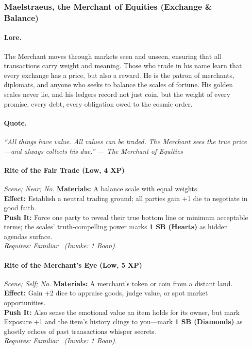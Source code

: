 \subsubsection{Maelstraeus, the Merchant of Equities (Exchange \& Balance)}

\paragraph{Lore.}
The Merchant moves through markets seen and unseen, ensuring that all transactions carry weight and meaning. Those who trade in his name learn that every exchange has a price, but also a reward. He is the patron of merchants, diplomats, and anyone who seeks to balance the scales of fortune. His golden scales never lie, and his ledgers record not just coin, but the weight of every promise, every debt, every obligation owed to the cosmic order.

\paragraph{Quote.}
\emph{``All things have value. All values can be traded. The Merchant sees the true price—and always collects his due.'' — The Merchant of Equities}

\paragraph{Rite of the Fair Trade (Low, 4 XP)} \emph{Scene; Near; No.}
\textbf{Materials:} A balance scale with equal weights. \\
\textbf{Effect:} Establish a neutral trading ground; all parties gain +1 die to negotiate in good faith. \\
\textbf{Push It:} Force one party to reveal their true bottom line or minimum acceptable terms; the scales' truth-compelling power marks \textbf{1 SB (Hearts)} as hidden agendas surface. \\
\emph{Requires: Familiar \ (\textit{Invoke:} 1 Boon).}

\paragraph{Rite of the Merchant's Eye (Low, 5 XP)} \emph{Scene; Self; No.}
\textbf{Materials:} A merchant's token or coin from a distant land. \\
\textbf{Effect:} Gain +2 dice to appraise goods, judge value, or spot market opportunities. \\
\textbf{Push It:} Also sense the emotional value an item holds for its owner, but mark Exposure +1 and the item's history clings to you—mark \textbf{1 SB (Diamonds)} as ghostly echoes of past transactions whisper secrets. \\
\emph{Requires: Familiar \ (\textit{Invoke:} 1 Boon).}

